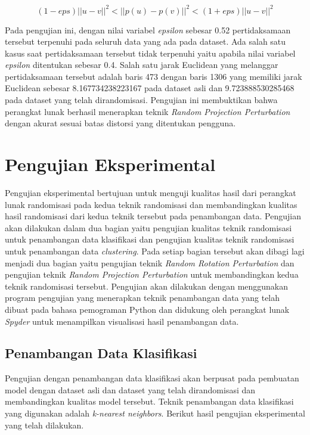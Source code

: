 \begin{equation}
	(1-eps)||u - v||^{2}<||p(u) - p(v)||^{2}<(1+eps)||u - v||^{2}
\end{equation}

Pada pengujian ini, dengan nilai variabel \textit{epsilon} sebesar 0.52 pertidaksamaan tersebut terpenuhi pada seluruh data yang ada pada dataset. Ada salah satu kasus saat pertidaksamaan tersebut tidak terpenuhi yaitu apabila nilai variabel \textit{epsilon} ditentukan sebesar 0.4. Salah satu jarak Euclidean yang melanggar pertidaksamaan tersebut adalah baris 473 dengan baris 1306 yang memiliki jarak Euclidean sebesar 8.167734238223167 pada dataset asli dan 9.723888530285468 pada dataset yang telah dirandomisasi. Pengujian ini membuktikan bahwa perangkat lunak berhasil menerapkan teknik \textit{Random Projection Perturbation} dengan akurat sesuai batas distorsi yang ditentukan pengguna.

\section{Pengujian Eksperimental}
\label{sec:pengujianeksperimental}

Pengujian eksperimental bertujuan untuk menguji kualitas hasil dari perangkat lunak randomisasi pada kedua teknik randomisasi dan membandingkan kualitas hasil randomisasi dari kedua teknik tersebut pada penambangan data. Pengujian akan dilakukan dalam dua bagian yaitu pengujian kualitas teknik randomisasi untuk penambangan data klasifikasi dan pengujian kualitas teknik randomisasi untuk penambangan data \textit{clustering}. Pada setiap bagian tersebut akan dibagi lagi menjadi dua bagian yaitu pengujian teknik \textit{Random Rotation Perturbation} dan pengujian teknik \textit{Random Projection Perturbation} untuk membandingkan kedua teknik randomisasi tersebut. Pengujian akan dilakukan dengan menggunakan program pengujian yang menerapkan teknik penambangan data yang telah dibuat pada bahasa pemograman Python dan didukung oleh perangkat lunak \textit{Spyder} untuk menampilkan visualisasi hasil penambangan data.

\subsection{Penambangan Data Klasifikasi}
\label{subsec:pengujian-klasifikasi}
Pengujian dengan penambangan data klasifikasi akan berpusat pada pembuatan model dengan dataset asli dan dataset yang telah dirandomisasi dan membandingkan kualitas model tersebut. Teknik penambangan data klasifikasi yang digunakan adalah \textit{k-nearest neighbors}. Berikut hasil pengujian eksperimental yang telah dilakukan.


